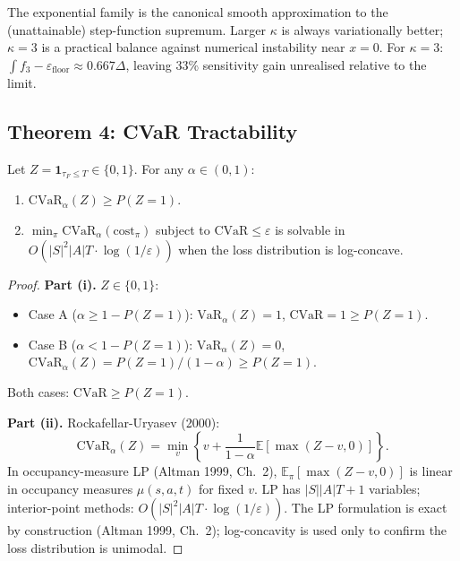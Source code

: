 \begin{remark}
The exponential family is the canonical smooth approximation to the
(unattainable) step-function supremum. Larger $\kappa$ is always
variationally better; $\kappa = 3$ is a practical balance against
numerical instability near $x = 0$. For $\kappa = 3$:
$\int f_3 - \varepsilon_{\mathrm{floor}} \approx 0.667 \Delta$,
leaving 33\% sensitivity gain unrealised relative to the limit.
\end{remark}

\subsection{Theorem 4: CVaR Tractability}

\begin{theorem}
\label{thm:tf-v4-cvar}
Let $Z = \mathbf{1}_{\tau_F \le T} \in \{0, 1\}$. For any $\alpha \in
(0, 1)$:
\begin{enumerate}
\item[(i)] $\mathrm{CVaR}_\alpha(Z) \ge P(Z = 1)$.
\item[(ii)] $\min_\pi \mathrm{CVaR}_\alpha(\mathrm{cost}_\pi)$
subject to $\mathrm{CVaR} \le \varepsilon$ is solvable in
$O(|S|^2 |A| T \cdot \log(1 / \varepsilon))$ when the loss
distribution is log-concave.
\end{enumerate}
\end{theorem}

\begin{proof}
\medskip\noindent\textbf{Part (i).}
$Z \in \{0, 1\}$:
\begin{itemize}
\item Case A ($\alpha \ge 1 - P(Z = 1)$): $\mathrm{VaR}_\alpha(Z) =
1$, $\mathrm{CVaR} = 1 \ge P(Z = 1)$.
\item Case B ($\alpha < 1 - P(Z = 1)$): $\mathrm{VaR}_\alpha(Z) =
0$, $\mathrm{CVaR}_\alpha(Z) = P(Z = 1) / (1 - \alpha) \ge
P(Z = 1)$.
\end{itemize}
Both cases: $\mathrm{CVaR} \ge P(Z = 1)$.

\medskip\noindent\textbf{Part (ii).}
Rockafellar-Uryasev (2000):
\begin{equation}
\mathrm{CVaR}_\alpha(Z) = \min_v\!\left\{v + \frac{1}{1 - \alpha}
\mathbb{E}[\max(Z - v, 0)]\right\}.
\end{equation}
In occupancy-measure LP (Altman 1999, Ch.~2),
$\mathbb{E}_\pi[\max(Z - v, 0)]$ is linear in occupancy measures
$\mu(s, a, t)$ for fixed $v$. LP has $|S| |A| T + 1$ variables;
interior-point methods: $O(|S|^2 |A| T \cdot \log(1 / \varepsilon))$.
The LP formulation is exact by construction (Altman 1999, Ch.~2);
log-concavity is used only to confirm the loss distribution is
unimodal.
\end{proof}


